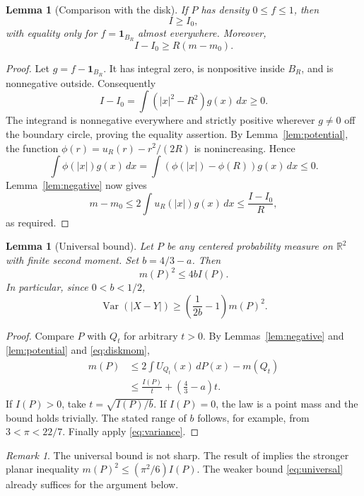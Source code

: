 \documentclass[11pt,a4paper]{amsart}
\newtheorem{lemma}[theorem]{Lemma}
\theoremstyle{remark}
\newtheorem{remark}[theorem]{Remark}
\newcommand{\R}{\mathbb R}
\newcommand{\Var}{\operatorname{Var}}
\newcommand{\ind}{\mathbf{1}}
\begin{document}
\begin{lemma}[Comparison with the disk]\label{lem:diskcompare}
If $P$ has density $0\le f\le1$, then
\begin{equation}\label{eq:inertia}
 I\ge I_0,
\end{equation}
with equality only for $f=\ind_{B_R}$ almost everywhere. Moreover,
\begin{equation}\label{eq:comparison}
 I-I_0\ge R(m-m_0).
\end{equation}
\end{lemma}
\begin{proof}
Let $g=f-\ind_{B_R}$. It has integral zero, is nonpositive inside
$B_R$, and is nonnegative outside. Consequently
\[
 I-I_0=\int (|x|^2-R^2)g(x)\,dx\ge0.
\]
The integrand is nonnegative everywhere and strictly positive wherever
$g\ne0$ off the boundary circle, proving the equality assertion.
By Lemma~\ref{lem:potential}, the function
$\phi(r)=u_R(r)-r^2/(2R)$ is nonincreasing. Hence
\[
 \int\phi(|x|)g(x)\,dx
 =\int(\phi(|x|)-\phi(R))g(x)\,dx\le0.
\]
Lemma~\ref{lem:negative} now gives
\[
 m-m_0\le 2\int u_R(|x|)g(x)\,dx
 \le \frac{I-I_0}{R},
\]
as required.
\end{proof}

\begin{lemma}[Universal bound]\label{lem:universal}
Let $P$ be any centered probability measure on $\R^2$ with finite
second moment. Set $b=4/3-a$. Then
\begin{equation}\label{eq:universal}
 m(P)^2\le 4bI(P).
\end{equation}
In particular, since $0<b<1/2$,
\begin{equation}\label{eq:universalV}
 \Var(|X-Y|)\ge \left(\frac1{2b}-1\right)m(P)^2.
\end{equation}
\end{lemma}
\begin{proof}
Compare $P$ with $Q_t$ for arbitrary $t>0$. By
Lemmas~\ref{lem:negative} and \ref{lem:potential} and
\eqref{eq:diskmom},
\begin{align*}
 m(P)&\le 2\int U_{Q_t}(x)\,dP(x)-m(Q_t)\\
 &\le \frac{I(P)}t+\left(\frac43-a\right)t.
\end{align*}
If $I(P)>0$, take $t=\sqrt{I(P)/b}$. If $I(P)=0$, the law is a
point mass and the bound holds trivially. The stated range of $b$
follows, for example, from $3<\pi<22/7$. Finally apply
\eqref{eq:variance}.
\end{proof}

\begin{remark}
The universal bound is not sharp. The result of \cite{BLRS} implies
the stronger planar inequality $m(P)^2\le (\pi^2/6)I(P)$. The weaker
bound \eqref{eq:universal} already suffices for the argument below.
\end{remark}
\end{document}
